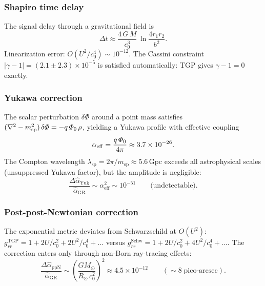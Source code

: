 \subsubsection{Shapiro time delay}

The signal delay through a gravitational field is
\begin{equation}\label{eq:shapiro}
  \Delta t
  \approx \frac{4\,G\,M}{c_{0}^{3}}\,\ln\!\frac{4r_{1}r_{2}}{b^{2}}.
\end{equation}
Linearization error: $O(U^{2}/c_{0}^{4})\sim 10^{-12}$.
The Cassini constraint $|\gamma-1|=(2.1\pm 2.3)\times 10^{-5}$ is
satisfied automatically: TGP gives $\gamma-1=0$ exactly.

\subsubsection{Yukawa correction}

The scalar perturbation $\delta\Phi$ around a point mass satisfies
$(\nabla^{2}-m_{\mathrm{sp}}^{2})\,\delta\varPhi=-q\,\varPhi_0\,\rho$,
yielding a Yukawa profile with effective coupling
\begin{equation}\label{eq:alpha-eff}
  \alpha_{\mathrm{eff}}
  = \frac{q\,\varPhi_0}{4\pi}
  \approx 3.7\times 10^{-26}.
\end{equation}
The Compton wavelength $\lambda_{\mathrm{sp}}=2\pi/m_{\mathrm{sp}}
\approx 5.6$\,Gpc exceeds all astrophysical scales (unsuppressed
Yukawa factor), but the amplitude is negligible:
\begin{equation}\label{eq:yukawa-correction}
  \frac{\Delta\hat\alpha_{\mathrm{Yuk}}}{\hat\alpha_{\mathrm{GR}}}
  \sim \alpha_{\mathrm{eff}}^{2} \sim 10^{-51}
  \qquad\text{(undetectable)}.
\end{equation}

\subsubsection{Post-post-Newtonian correction}

The exponential metric deviates from Schwarzschild at $O(U^{2})$:
$g_{rr}^{\mathrm{TGP}}=1+2U/c_{0}^{2}+2U^{2}/c_{0}^{4}+\ldots$
versus
$g_{rr}^{\mathrm{Schw}}=1+2U/c_{0}^{2}+4U^{2}/c_{0}^{4}+\ldots$.
The correction enters only through non-Born ray-tracing effects:
\begin{equation}\label{eq:ppN-lensing}
  \frac{\Delta\hat\alpha_{\mathrm{ppN}}}{\hat\alpha_{\mathrm{GR}}}
  \sim \left(\frac{GM_{\odot}}{R_{\odot}\,c_{0}^{2}}\right)^{2}
  \approx 4.5\times 10^{-12}
  \qquad(\sim 8\;\text{pico-arcsec}).
\end{equation}

